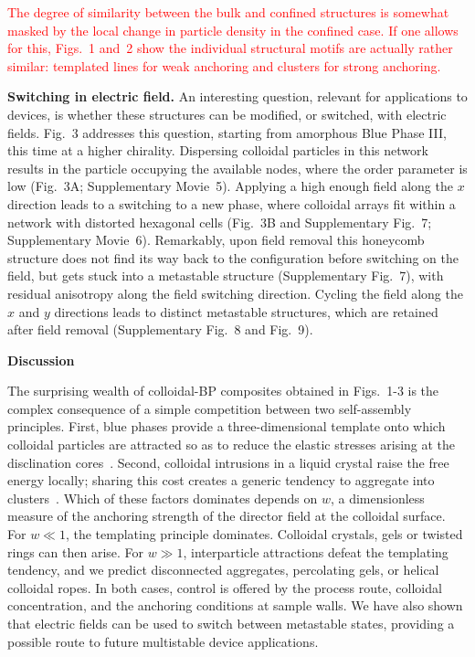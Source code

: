 \documentclass[12pt]{article}
\begin{document}
\textcolor{red}{
The degree of similarity between
the bulk and confined structures is somewhat masked by the local
change in particle density in the confined case. If one allows for
this, Figs.~1 and~2 show the individual structural motifs are actually
rather similar: templated lines for weak anchoring and clusters for
strong anchoring.
}

\medskip
\noindent
\textbf{Switching in electric field.}
An interesting question, relevant for applications to devices, is whether 
these structures can be modified, or switched, with electric fields.
Fig.~3 addresses this question, starting from amorphous Blue Phase III,
this time at a higher chirality. Dispersing colloidal particles in this
network
results in the particle occupying the available nodes, where the order
parameter is low (Fig.~3A; Supplementary Movie~5). Applying a high enough
field 
along the $x$ direction leads to a switching to a new phase, where colloidal 
arrays fit within a network with distorted hexagonal cells (Fig.~3B 
and Supplementary Fig.~7; Supplementary Movie~6). 
Remarkably, upon field removal this honeycomb structure does not find its 
way back to the 
configuration before switching on the field, but gets stuck into a metastable 
structure (Supplementary Fig.~7), with residual anisotropy along the field
switching 
direction. Cycling the field along the $x$ and $y$ directions leads to
distinct metastable structures, which are retained after field removal
(Supplementary Fig.~8 and Fig.~9).

\medskip
\noindent
\textbf{\large Discussion}

\noindent
The surprising wealth of colloidal-BP composites obtained in Figs.~1-3 is
the complex consequence of a simple competition between two self-assembly
principles. 
First, blue phases provide a three-dimensional template onto which
colloidal particles are attracted so as to reduce the elastic stresses
arising at the disclination cores~\cite{miha}. Second, colloidal intrusions
in a liquid crystal raise the free energy locally; sharing this cost creates
a generic tendency to aggregate into clusters~\cite{tiffany}. Which of these
factors dominates depends on $w$, a dimensionless measure of the anchoring
strength of the director field at the colloidal surface. For $w\ll 1$, the
templating principle dominates. Colloidal crystals, gels or twisted rings
can then arise. For $w \gg 1$, interparticle attractions defeat the
templating tendency, and we predict disconnected aggregates, percolating
gels, or helical colloidal ropes. In both cases, control is offered by the
process route, colloidal concentration, and the anchoring conditions at
sample walls. We have also shown that electric fields can be used to
switch between metastable states, providing a possible route to future
multistable device applications.
\end{document}
